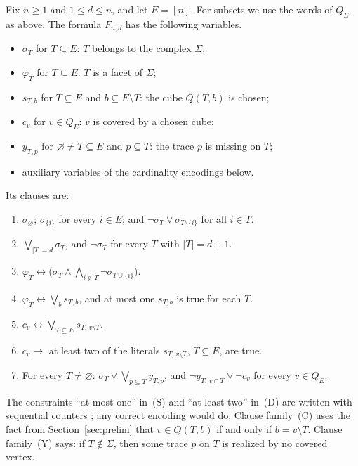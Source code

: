 \documentclass[11pt]{article}
\numberwithin{equation}{section}
\theoremstyle{definition}
\theoremstyle{remark}
\begin{document}
Fix \(n\ge1\) and \(1\le d\le n\), and let \(E=[n]\).  For subsets we use
the words of \(Q_E\) as above.  The formula \(F_{n,d}\) has the following
variables.
\begin{itemize}
\item \(\sigma_T\) for \(T\subseteq E\): \(T\) belongs to the complex
      \(\Sigma\);
\item \(\varphi_T\) for \(T\subseteq E\): \(T\) is a facet of \(\Sigma\);
\item \(s_{T,b}\) for \(T\subseteq E\) and \(b\subseteq E\setminus T\):
      the cube \(Q(T,b)\) is chosen;
\item \(c_v\) for \(v\in Q_E\): \(v\) is covered by a chosen cube;
\item \(y_{T,p}\) for \(\varnothing\neq T\subseteq E\) and \(p\subseteq
      T\): the trace \(p\) is missing on \(T\);
\item auxiliary variables of the cardinality encodings below.
\end{itemize}
Its clauses are:
\begin{enumerate}
\item[(\(\Sigma\))] \(\sigma_\varnothing\); \(\sigma_{\{i\}}\) for every \(i\in E\);
      and \(\neg\sigma_T\vee\sigma_{T\setminus\{i\}}\) for all \(i\in T\).
\item[(VC)] \(\bigvee_{|T|=d}\sigma_T\), and \(\neg\sigma_T\) for every
      \(T\) with \(|T|=d+1\).
\item[(\(\Phi\))] \(\varphi_T\leftrightarrow\bigl(\sigma_T\wedge
      \bigwedge_{i\notin T}\neg\sigma_{T\cup\{i\}}\bigr)\).
\item[(S)] \(\varphi_T\leftrightarrow\bigvee_b s_{T,b}\), and at most one
      \(s_{T,b}\) is true for each \(T\).
\item[(C)] \(c_v\leftrightarrow\bigvee_{T\subseteq E}s_{T,\,v\setminus T}\).
\item[(D)] \(c_v\rightarrow\) at least two of the literals
      \(s_{T,\,v\setminus T}\), \(T\subseteq E\), are true.
\item[(Y)] For every \(T\neq\varnothing\):
      \(\sigma_T\vee\bigvee_{p\subseteq T}y_{T,p}\), and
      \(\neg y_{T,\,v\cap T}\vee\neg c_v\) for every \(v\in Q_E\).
\end{enumerate}
The constraints ``at most one'' in~(S) and ``at least two'' in~(D) are
written with sequential counters \cite{Sinz05}; any correct encoding would
do.  Clause family~(C) uses the fact from Section~\ref{sec:prelim} that
\(v\in Q(T,b)\) if and only if \(b=v\setminus T\).  Clause family~(Y) says:
if \(T\notin\Sigma\), then some trace \(p\) on \(T\) is realized by no
covered vertex.
\end{document}
